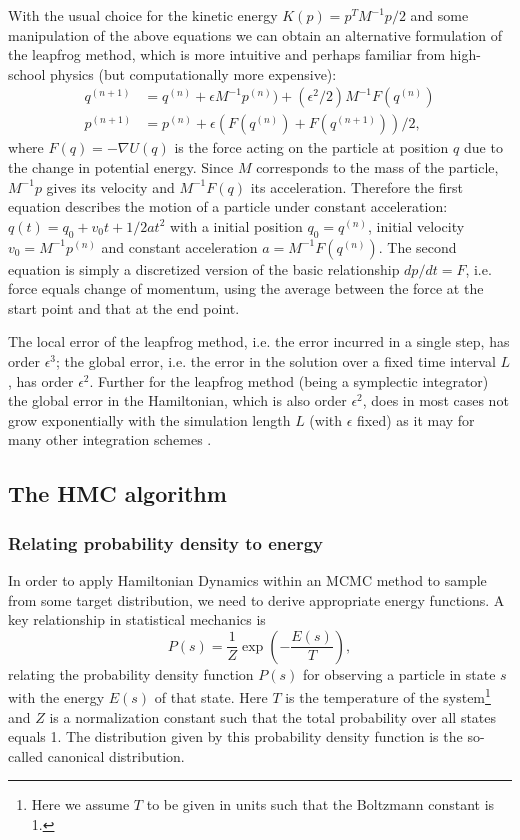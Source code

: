 \documentclass[12pt]{scrartcl}
\begin{document}
With the usual choice for the kinetic energy $K(p) = p^T M^{-1} p /2$ and some manipulation of the above equations we can obtain an alternative formulation of the leapfrog method, which is more intuitive and perhaps familiar from high-school physics (but computationally more expensive):
\begin{equation}
\begin{split}
q^{(n + 1)} &= q^{(n)} + \epsilon M^{-1} p^{(n)}) + (\epsilon^2/2) M^{-1} F(q^{(n)}) \\
p^{(n + 1)} &= p^{(n)} + \epsilon (F(q^{(n)}) + F(q^{(n+1)}))/2,
\end{split}
\end{equation}
where $F(q) = - \nabla U(q)$ is the force acting on the particle at position $q$ due to the change in potential energy. Since $M$ corresponds to the mass of the particle, $M^{-1} p$ gives its velocity and $M^{-1} F(q)$ its acceleration. Therefore the first equation describes the motion of a particle under constant acceleration: $q(t) = q_0 + v_0 t + 1/2 a t^2$ with a initial position $q_0 = q^{(n)}$, initial velocity $v_0 = M^{-1} p^{(n)}$ and constant acceleration $a = M^{-1} F(q^{(n)})$. The second equation is simply a discretized version of the basic relationship $dp/dt = F$, i.e. force equals change of momentum, using the average between the force at the start point and that at the end point.

The local error of the leapfrog method, i.e. the error incurred in a single step, has order $\epsilon^3$; the global error, i.e. the error in the solution over a fixed time interval $L$, has order $\epsilon^2$. Further for the leapfrog method (being a symplectic integrator) the global error in the Hamiltonian, which is also order $\epsilon^2$, does in most cases not grow exponentially with the simulation length $L$ (with $\epsilon$ fixed) as it may for many other integration schemes \citep{Neal2011}.

\subsection{The HMC algorithm}
\label{sec:HMCAlgorithmSection}
\subsubsection{Relating probability density to energy}
In order to apply Hamiltonian Dynamics within an MCMC method to sample from some target distribution, we need to derive appropriate energy functions. A key relationship in statistical mechanics is
\begin{equation}
P(s) = \frac{1}{Z} \exp \left(- \frac{E(s)}{T} \right),
\end{equation}
relating the probability density function $P(s)$ for observing a particle in state $s$ with the energy $E(s)$ of that state. Here $T$ is the temperature of the system\footnote{Here we assume $T$ to be given in units such that the Boltzmann constant is 1.} and $Z$ is a normalization constant such that the total probability over all states equals 1. The distribution given by this probability density function is the so-called canonical distribution.
\end{document}

